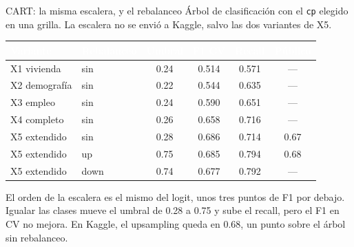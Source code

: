 \documentclass[aspectratio=169,10pt]{beamer}
\newcommand{\fila}{\rowcolor{rowAlt}}
\newcommand{\hh}[1]{\cellcolor{uniandesInk}\textcolor{white}{\textbf{#1}}}
\begin{document}
\begin{frame}{CART: la misma escalera, y el rebalanceo}
  Árbol de clasificación con el \texttt{cp} elegido en una grilla. La escalera no se envió a Kaggle, salvo las dos variantes de X5.
  \vspace{0.35em}
  \footnotesize
  \begin{center}
  \begin{tabular}{@{}llcccc@{}}
    \toprule
    \hh{Variante} & \hh{Rebalanceo} & \hh{Umbral} & \hh{F1 CV} & \hh{Recall} & \hh{Público} \\
    \midrule
    X1 vivienda & sin & 0.24 & 0.514 & 0.571 & --- \\
    \fila X2 demografía & sin & 0.22 & 0.544 & 0.635 & --- \\
    X3 empleo & sin & 0.24 & 0.590 & 0.651 & --- \\
    \fila X4 completo & sin & 0.26 & 0.658 & 0.716 & --- \\
    X5 extendido & sin & 0.28 & 0.686 & 0.714 & 0.67 \\
    \fila X5 extendido & up & 0.75 & 0.685 & 0.794 & 0.68 \\
    X5 extendido & down & 0.74 & 0.677 & 0.792 & --- \\
    \bottomrule
  \end{tabular}
  \end{center}
  \vspace{0.4em}
  El orden de la escalera es el mismo del logit, unos tres puntos de F1 por debajo. Igualar las clases mueve el umbral de 0.28 a 0.75 y sube el recall, pero el F1 en CV no mejora. En Kaggle, el upsampling queda en 0.68, un punto sobre el árbol sin rebalanceo.
\end{frame}
\end{document}
